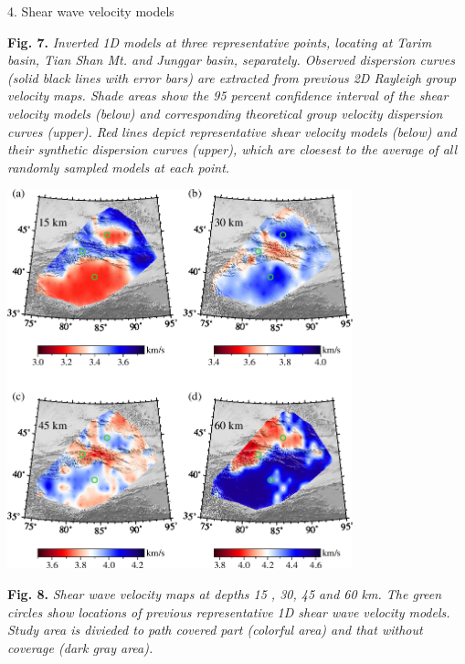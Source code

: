 \documentclass[
    landscape,      %
    paperwidth = 1200mm,
    paperheight = 900mm,
    fontscale = 0.4,
    margin = 1.7cm,
]{baposter}
\begin{document}
\begin{poster}
\begin{posterbox}[column=2 ]{4. Shear wave velocity models}
\begin{center}
\begin{minipage}{0.9\textwidth}
\small
\textbf{Fig. 7.}
\itshape
Inverted 1D models at three representative points, locating at Tarim basin, Tian Shan Mt. and Junggar basin, separately.
Observed dispersion curves (solid black lines with error bars) are extracted from previous 2D Rayleigh group velocity maps.
Shade areas show the 95 percent confidence interval of the shear velocity models (below) and corresponding theoretical
group velocity dispersion curves (upper). Red lines depict representative shear velocity models (below)
and their synthetic dispersion curves (upper), which are cloesest to the average of all randomly sampled models at each point.
\end{minipage}
\end{center}

\begin{center}
\includegraphics[width=0.75\textwidth]{./images/shear_velocity_maps.png}
\begin{minipage}{0.9\textwidth}
\footnotesize
\vspace{0.2em}
\textbf{Fig. 8.}
\itshape
 Shear wave velocity maps at depths 15 , 30, 45 and 60 km. The green circles show locations of previous representative 1D shear wave velocity models.
 Study area is divieded to path covered part (colorful area) and that without coverage (dark gray area).

\end{minipage}
\end{center}


\end{posterbox}
\end{poster}
\end{document}
